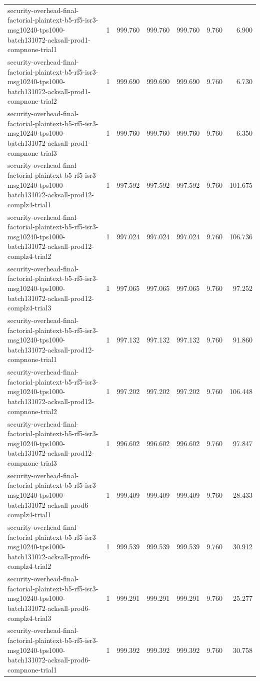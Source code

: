 \begin{tabular}{lrrrrrr}
security-overhead-final-factorial-plaintext-b5-rf5-isr3-msg10240-tps1000-batch131072-acksall-prod1-compnone-trial1 & 1 & 999.760 & 999.760 & 999.760 & 9.760 & 6.900 \\
security-overhead-final-factorial-plaintext-b5-rf5-isr3-msg10240-tps1000-batch131072-acksall-prod1-compnone-trial2 & 1 & 999.690 & 999.690 & 999.690 & 9.760 & 6.730 \\
security-overhead-final-factorial-plaintext-b5-rf5-isr3-msg10240-tps1000-batch131072-acksall-prod1-compnone-trial3 & 1 & 999.760 & 999.760 & 999.760 & 9.760 & 6.350 \\
security-overhead-final-factorial-plaintext-b5-rf5-isr3-msg10240-tps1000-batch131072-acksall-prod12-complz4-trial1 & 1 & 997.592 & 997.592 & 997.592 & 9.760 & 101.675 \\
security-overhead-final-factorial-plaintext-b5-rf5-isr3-msg10240-tps1000-batch131072-acksall-prod12-complz4-trial2 & 1 & 997.024 & 997.024 & 997.024 & 9.760 & 106.736 \\
security-overhead-final-factorial-plaintext-b5-rf5-isr3-msg10240-tps1000-batch131072-acksall-prod12-complz4-trial3 & 1 & 997.065 & 997.065 & 997.065 & 9.760 & 97.252 \\
security-overhead-final-factorial-plaintext-b5-rf5-isr3-msg10240-tps1000-batch131072-acksall-prod12-compnone-trial1 & 1 & 997.132 & 997.132 & 997.132 & 9.760 & 91.860 \\
security-overhead-final-factorial-plaintext-b5-rf5-isr3-msg10240-tps1000-batch131072-acksall-prod12-compnone-trial2 & 1 & 997.202 & 997.202 & 997.202 & 9.760 & 106.448 \\
security-overhead-final-factorial-plaintext-b5-rf5-isr3-msg10240-tps1000-batch131072-acksall-prod12-compnone-trial3 & 1 & 996.602 & 996.602 & 996.602 & 9.760 & 97.847 \\
security-overhead-final-factorial-plaintext-b5-rf5-isr3-msg10240-tps1000-batch131072-acksall-prod6-complz4-trial1 & 1 & 999.409 & 999.409 & 999.409 & 9.760 & 28.433 \\
security-overhead-final-factorial-plaintext-b5-rf5-isr3-msg10240-tps1000-batch131072-acksall-prod6-complz4-trial2 & 1 & 999.539 & 999.539 & 999.539 & 9.760 & 30.912 \\
security-overhead-final-factorial-plaintext-b5-rf5-isr3-msg10240-tps1000-batch131072-acksall-prod6-complz4-trial3 & 1 & 999.291 & 999.291 & 999.291 & 9.760 & 25.277 \\
security-overhead-final-factorial-plaintext-b5-rf5-isr3-msg10240-tps1000-batch131072-acksall-prod6-compnone-trial1 & 1 & 999.392 & 999.392 & 999.392 & 9.760 & 30.758 \\

\end{tabular}
